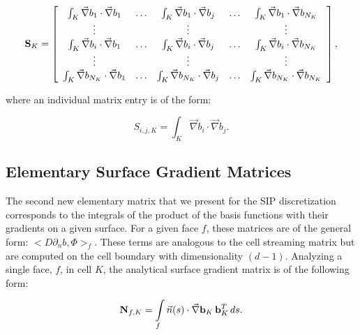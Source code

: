 \begin{equation}
\label{eq::DSA_stiffness_matrix_array}
{\bf S}_K =   \left[
\begin{array} {ccccc}
	\int_K \vec{\nabla}b_1 \cdot \vec{\nabla} b_1  & \ldots & \int_K \vec{\nabla}b_1 \cdot \vec{\nabla} b_j  & \ldots & \int_K \vec{\nabla}b_1 \cdot \vec{\nabla}b_{N_K} \\
	\vdots  &  & \vdots  &  & \vdots \\
	\int_K \vec{\nabla} b_i \cdot \vec{\nabla} b_1  & \ldots & \int_K \vec{\nabla}b_i \cdot \vec{\nabla} b_j  & \ldots & \int_K \vec{\nabla}b_i \cdot \vec{\nabla}b_{N_K} \\
	\vdots  &  & \vdots  &  & \vdots \\
	\int_K \vec{\nabla} b_{N_K}\cdot \vec{\nabla} b_1  & \ldots & \int_K \vec{\nabla} b_{N_K}\cdot \vec{\nabla} b_j  & \ldots & \int_K \vec{\nabla} b_{N_K} \cdot \vec{\nabla} b_{N_K} \\
\end{array}
\right] ,
\end{equation}

\noindent where an individual matrix entry is of the form:

\begin{equation}
\label{eq::DSA_stiffness_matrix_entry}
S_{i,j,K} =  \int_K \vec{\nabla}b_i \cdot \vec{\nabla} b_j .
\end{equation}

\subsection{Elementary Surface Gradient Matrices}
\label{sec::DSA_SIP_SurfaceGradient}

The second new elementary matrix that we present for the SIP discretization corresponds to the integrals of the product of the basis functions with their gradients on a given surface. For a given face $f$, these matrices are of the general form: $\Big<  D \partial_n b, \Phi \Big>_f$. These terms are analogous to the cell streaming matrix but are computed on the cell boundary with dimensionality $(d-1)$. Analyzing a single face, $f$, in cell $K$, the analytical surface gradient matrix is of the following form:

\begin{equation}
\label{eq::DSA_surface_gradient_matrix_analytical}
{\bf N}_{f,K}  =    \int\limits_f \vec{n} (s)  \cdot \vec{\nabla} {\bf b}_K \, {\bf b}_K^T \, d s .
\end{equation}

